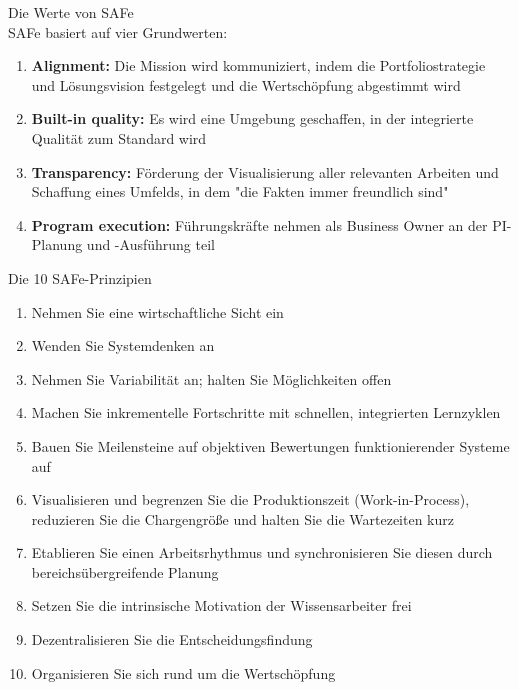 \begin{definition}{Die Werte von SAFe}\\
    SAFe basiert auf vier Grundwerten:
    \begin{enumerate}
        \item \textbf{Alignment:} Die Mission wird kommuniziert, indem die Portfoliostrategie und Lösungsvision festgelegt und die Wertschöpfung abgestimmt wird
        
        \item \textbf{Built-in quality:} Es wird eine Umgebung geschaffen, in der integrierte Qualität zum Standard wird
        
        \item \textbf{Transparency:} Förderung der Visualisierung aller relevanten Arbeiten und Schaffung eines Umfelds, in dem "die Fakten immer freundlich sind"
        
        \item \textbf{Program execution:} Führungskräfte nehmen als Business Owner an der PI-Planung und -Ausführung teil
    \end{enumerate}
\end{definition}

\begin{concept}{Die 10 SAFe-Prinzipien}\\
    \begin{enumerate}
        \item Nehmen Sie eine wirtschaftliche Sicht ein
        \item Wenden Sie Systemdenken an
        \item Nehmen Sie Variabilität an; halten Sie Möglichkeiten offen
        \item Machen Sie inkrementelle Fortschritte mit schnellen, integrierten Lernzyklen
        \item Bauen Sie Meilensteine auf objektiven Bewertungen funktionierender Systeme auf
        \item Visualisieren und begrenzen Sie die Produktionszeit (Work-in-Process), reduzieren Sie die Chargengröße und halten Sie die Wartezeiten kurz
        \item Etablieren Sie einen Arbeitsrhythmus und synchronisieren Sie diesen durch bereichsübergreifende Planung
        \item Setzen Sie die intrinsische Motivation der Wissensarbeiter frei
        \item Dezentralisieren Sie die Entscheidungsfindung
        \item Organisieren Sie sich rund um die Wertschöpfung
    \end{enumerate}
\end{concept}

